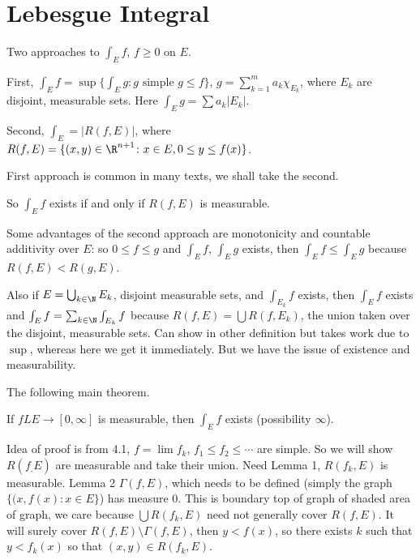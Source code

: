 \newpage
\section{Lebesgue Integral}




Two approaches to $\int_E f$, $f \geq 0$ on $E$.

First, $\int_E f= \sup \{ \int_E g \colon g \text{ simple } g \leq f\}$, $g = \sum_{k=1}^m a_k \chi_{E_k}$, where $E_k$ are disjoint, measurable sets. Here $\int_E g = \sum a_k |E_k|$.

Second, $\int_E = |R(f,E)|$, where $R(f,E)= \{ (x,y) \in \R^{n+1} \colon x \in E, 0 \leq y \leq f(x)\}$. 

First approach is common in many texts, we shall take the second. 

So $\int_E f$ exists if and only if $R(f,E)$ is measurable. 



Some advantages of the second approach are monotonicity and countable additivity over $E$: so $0 \leq f \leq g$ and $\int_E f$, $\int_E g$ exists, then $\int_E f \leq \int_E g$ because $R(f,E) < R(g,E)$. 


Also  if $E= \bigcup_{k \in \N} E_k$, disjoint measurable sets, and $\int_{E_k} f$ exists, then $\int_E f$ exists and $\int_E f= \sum_{k \in \N} \int_{E_k} f$ because $R(f,E)= \bigcup R(f,E_k)$, the union taken over the disjoint, measurable sets. Can show in other definition but takes work due to $\sup$, whereas here we get it immediately. But we have the issue of existence and measurability. 

The following main theorem. 


\begin{thm}
If $fL E \to [0,\infty]$ is measurable, then $\int_E f$ exists (possibility $\infty$). 
\end{thm}



Idea of proof is from 4.1, $f= \lim f_k$, $f_1 \leq f_2 \leq \cdots$ are simple. So we will show $R(f_,E)$ are measurable and take their union. Need Lemma 1, $R(f_k,E)$ is measurable. Lemma 2 $\Gamma(f,E)$, which needs to be defined (simply the graph $\{(x,f(x) \colon x \in E\}$) has measure 0. This is boundary top of graph of shaded area of graph, we care because $\bigcup R(f_k,E)$ need not generally cover $R(f,E)$. It will surely cover $R(f,E) \setminus \Gamma(f,E)$, then $y<f(x)$, so there exists $k$ such that $y<f_k(x)$ so that $(x,y) \in R(f_k,E)$. 




